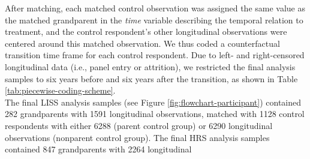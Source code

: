 \documentclass[
  english,
  man,floatsintext]{apa7}
\begin{document}
After matching, each matched control observation was assigned the same value as the matched grandparent in the \emph{time} variable describing the temporal relation to treatment, and the control respondent's other longitudinal observations were centered around this matched observation. We thus coded a counterfactual transition time frame for each control respondent. Due to left- and right-censored longitudinal data (i.e., panel entry or attrition), we restricted the final analysis samples to six years before and six years after the transition, as shown in Table \ref{tab:piecewise-coding-scheme}.\\
The final LISS analysis samples (see Figure \ref{fig:flowchart-participant}) contained 282 grandparents with 1591 longitudinal observations, matched with 1128 control respondents with either 6288 (parent control group) or 6290 longitudinal observations (nonparent control group). The final HRS analysis samples contained 847 grandparents with 2264 longitudinal
\end{document}
